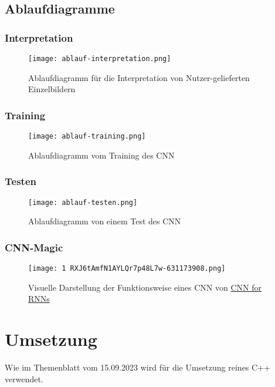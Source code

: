 \subsection{Ablaufdiagramme}
\label{sec:AnalyseAblaufdiagramme}

\subsubsection{Interpretation}
\label{sec:AnalyseInterpretation}
\begin{figure}[H]
\centering
\texttt{[image: ablauf-interpretation.png]}
\caption{Ablaufdiagramm für die Interpretation von Nutzer-gelieferten Einzelbildern}
\label{fig:analyseablauf-interpretation}
\end{figure}


\subsubsection{Training}
\label{sec:AnalyseTraining}
\begin{figure}[H]
\centering
\texttt{[image: ablauf-training.png]}
\caption{Ablaufdiagramm vom Training des CNN}
\label{fig:analyseablauf-training}
\end{figure}


\subsubsection{Testen}
\label{sec:AnalyseTesten}
\begin{figure}[H]
\centering
\texttt{[image: ablauf-testen.png]}
\caption{Ablaufdiagramm von einem Test des CNN}
\label{fig:analyseablauf-testen}
\end{figure}


\subsubsection{CNN-Magic}
\label{sec:AnalyseCNN-Magic}
\begin{figure}[H]
\centering
\texttt{[image: 1 RXJ6tAmfN1AYLQr7p48L7w-631173908.png]}
\caption{Visuelle Darstellung der Funktionsweise eines CNN von \href{https://blog.goodaudience.com/cnn-for-rnns-a-gentle-approach-to-use-cnns-for-nlp-53ab80768d43}{CNN for RNNs}}
\label{fig:analyse1RXJ6tAmfN1AYLQr7p48L7w-631173908}
\end{figure}

\section{Umsetzung}
\label{sec:AnalyseUmsetzung}
Wie im Themenblatt vom 15.09.2023 wird für die Umsetzung reines C++ verwendet.

